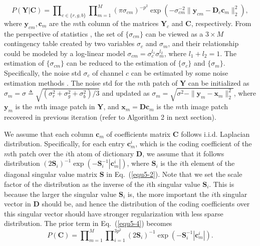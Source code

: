\begin{equation}
\label{equ5-5}
P(\bm{Y}|\bm{C}) 
= 
\prod\nolimits_{c\in\{r, g, b\}}
\prod\nolimits_{m=1}^{M}
(\pi\sigma_{cm})^{-p^{2}}
\exp(-\sigma_{cm}^{-2}\|\bm{y}_{cm}-\bm{D}_{c}\bm{c}_{m}\|_{2}^{2}),
\end{equation}
where $\bm{y}_{cm},\bm{c}_{m}$ are the $m$th column of the matrices $\bm{Y}_{c}$ and $\bm{C}$, respectively. From the perspective of statistics \cite{glm}, the set of $\{\sigma_{cm}\}$ can be viewed as a $3\times M$ contingency table created by two variables $\sigma_{c}$ and $\sigma_{m}$, and their relationship could be modeled by a log-linear model $\sigma_{cm}=\sigma_{c}^{l_{1}}\sigma_{m}^{l_{2}}$, where $l_{1}+l_{2}=1$. The estimation of $\{\sigma_{cm}\}$ can be reduced to the estimation of $\{\sigma_{c}\}$ and $\{\sigma_{m}\}$. Specifically, the noise std $\sigma_{c}$ of channel $c$ can be estimated by some noise estimation methods \cite{Chen2015ICCV}. The noise std for the $m$th patch of $\bm{Y}$ can be initialized as 
$
\sigma_{m}=\sigma\triangleq \sqrt{(\sigma_{r}^{2}+\sigma_{g}^{2}+\sigma_{b}^{2})/3}
$
and updated as $\sigma_{m}=\sqrt{\sigma^2-\|\bm{y}_{m}-\bm{x}_{m}\|_{2}^{2}}$, where $\bm{y}_{m}$ is the $m$th image patch in $\bm{Y}$, and $\bm{x}_{m}=\bm{D}\bm{c}_{m}$ is the $m$th image patch recovered in previous iteration (refer to Algorithm 2 in next section).\

We assume that each column $\bm{c}_{m}$ of coefficients matrix $\bm{C}$ follows i.i.d. Laplacian distribution. Specifically, for each entry $\bm{c}_{m}^{i}$, which is the coding coefficient of the $m$th patch over the $i$th atom of dictionary $\bm{D}$, we assume that it follows distribution  $(2\bm{S}_{i})^{-1}\exp(-\bm{S}_{i}^{-1}|\bm{c}_{m}^{i}|)$, where $\bm{S}_{i}$ is the $i$th element of the diagonal singular value matrix $\bm{S}$ in Eq.\ (\ref{equ5-2}). Note that we set the scale factor of the distribution as the inverse of the $i$th singular value $\bm{S}_{i}$. This is because the larger the singular value $\bm{S}_{i}$ is, the more important the $i$th singular vector in $\bm{D}$ should be, and hence the distribution of the coding coefficients over this singular vector should have stronger regularization with less sparse distribution. The prior term in Eq.\ (\ref{equ5-4}) becomes
\begin{equation}
\label{equ5-6}
P(\bm{C})
=
\prod\nolimits_{m=1}^{M}
\prod\nolimits_{i=1}^{3p^{2}}
(2\bm{S}_{i})^{-1}\exp(-\bm{S}_{i}^{-1}|\bm{c}_{m}^{i}|).
\end{equation}


